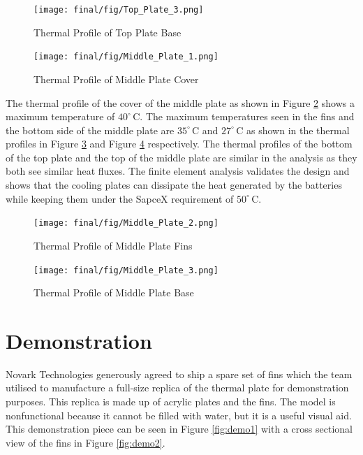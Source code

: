 \documentclass[11pt]{article}
\numberwithin{equation}{subsection} %
\newcommand{\unit}[1]{\ensuremath{\, \mathrm{#1}}}             %
\newcommand{\degree}{^\circ}                                   %
\begin{document}
\begin{figure}[!htb]
    \centering
    \texttt{[image: final/fig/Top\_Plate\_3.png]}
    \caption{Thermal Profile of Top Plate Base}
    \label{fig:Top_Plate_3}
\end{figure}

\begin{figure}[!htb]
    \centering
    \texttt{[image: final/fig/Middle\_Plate\_1.png]}
    \caption{Thermal Profile of Middle Plate Cover}
    \label{fig:Middle_Plate_1}
\end{figure}


The thermal profile of the cover of the middle plate as shown in Figure \ref{fig:Middle_Plate_1} shows a maximum temperature of $40\degree\unit{C}$. The maximum temperatures seen in the fins and the bottom side of the middle plate are $35\degree\unit{C}$ and $27\degree\unit{C}$ as shown in the thermal profiles in  Figure \ref{fig:Middle_Plate_2} and Figure \ref{fig:Middle_Plate_3} respectively. The thermal profiles of the bottom of the top plate and the top of the middle plate are similar in the analysis as they both see similar heat fluxes. The finite element analysis validates the design and shows that the cooling plates can dissipate the heat generated by the batteries while keeping them under the SapceX requirement of $50\degree\unit{C}$.

\begin{figure}[!htb]
    \centering
    \texttt{[image: final/fig/Middle\_Plate\_2.png]}
    \caption{Thermal Profile of Middle Plate Fins}
    \label{fig:Middle_Plate_2}
\end{figure}

\begin{figure}[!h]
    \centering
    \texttt{[image: final/fig/Middle\_Plate\_3.png]}
    \caption{Thermal Profile of Middle Plate Base}
    \label{fig:Middle_Plate_3}
\end{figure}

\section{Demonstration}
Novark Technologies generously agreed to ship a spare set of fins which the team utilised to manufacture a full-size replica of the thermal plate for demonstration purposes. This replica is made up of acrylic plates and the fins. The model is nonfunctional because it cannot be filled with water, but it is a useful visual aid. This demonstration piece can be seen in Figure \ref{fig:demo1} with a cross sectional view of the fins in Figure \ref{fig:demo2}.
\end{document}
